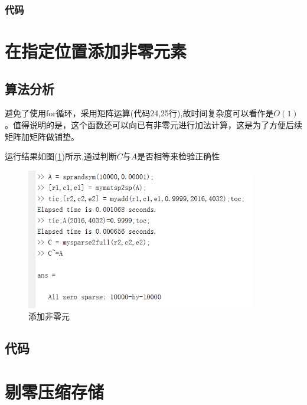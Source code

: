\documentclass[a4paper,left=2.5cm,right=2.5cm]{article}
\begin{document}
\begin{spacing}{1.6}
		\subsubsection{代码}
		
		\section{在指定位置添加非零元素}
		\subsection{算法分析}
		避免了使用for循环，采用矩阵运算(代码24,25行),故时间复杂度可以看作是$O(1)$。值得说明的是，这个函数还可以向已有非零元进行加法计算，这是为了方便后续矩阵加矩阵做铺垫。
		
		运行结果如图(\ref{add})所示,通过判断$C$与$A$是否相等来检验正确性
		\begin{figure}[H]
			\includegraphics[width=0.9\textwidth]{image/add.png}
			\caption{添加非零元}
			\label{add}
		\end{figure}
		\subsection{代码}
		
		\section{剔零压缩存储}

\end{spacing}
\end{document}
